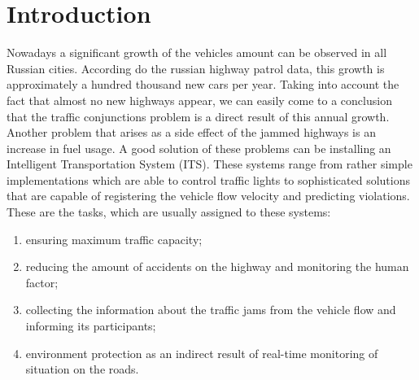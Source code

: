 \documentclass[12pt,a4paper,oneside,titlepage]{article}
\begin{document}
\section{Introduction}

Nowadays a significant growth of the vehicles amount can be observed in all Russian cities.
According do the russian highway patrol data, this growth is approximately a hundred thousand new cars per year.
Taking into account the fact that almost no new highways appear, we can easily come to a conclusion that the traffic conjunctions problem is a direct result of this annual growth.
Another problem that arises as a side effect of the jammed highways is an increase in fuel usage.
A good solution of these problems can be installing an Intelligent Transportation System (ITS).
These systems range from rather simple implementations which are able to control traffic lights to sophisticated solutions that are capable of registering the vehicle flow velocity and predicting violations.
These are the tasks, which are usually assigned to these systems:
\begin{enumerate}
  \item ensuring maximum traffic capacity;
  \item reducing the amount of accidents on the highway and monitoring the human factor;
  \item collecting the information about the traffic jams from the vehicle flow and informing its participants;
  \item environment protection as an indirect result of real-time monitoring of situation on the roads.
\end{enumerate}
\end{document}
